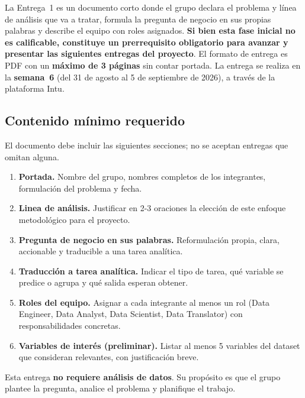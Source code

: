 \documentclass[11pt,letterpaper]{article}
\begin{document}
La Entrega~1 es un documento corto donde el grupo declara el problema y línea de análisis que va a tratar, formula la pregunta de negocio en sus propias palabras y describe el equipo con roles asignados. \textbf{Si bien esta fase inicial no es calificable, constituye un prerrequisito obligatorio para avanzar y presentar las siguientes entregas del proyecto}. El formato de entrega es PDF con un \textbf{máximo de 3 páginas} sin contar portada. La entrega se realiza en la \textbf{semana~6} (del 31 de agosto al 5 de septiembre de 2026), a través de la plataforma Intu.



\subsection{Contenido mínimo requerido}

El documento debe incluir las siguientes secciones; no se aceptan entregas que omitan alguna.

\begin{enumerate}
  \item \textbf{Portada.} Nombre del grupo, nombres completos de los integrantes, formulación del problema y fecha.
 \item \textbf{Linea de análisis.} Justificar en 2-3 oraciones la elección de este enfoque metodológico para el proyecto.
  \item \textbf{Pregunta de negocio en sus palabras.} Reformulación propia, clara, accionable y traducible a una tarea analítica.
  \item \textbf{Traducción a tarea analítica.} Indicar el tipo de tarea, qué variable se predice o agrupa y qué salida esperan obtener.
  \item \textbf{Roles del equipo.} Asignar a cada integrante al menos un rol (Data Engineer, Data Analyst, Data Scientist, Data Translator) con responsabilidades concretas.
  \item \textbf{Variables de interés (preliminar).} Listar al menos 5 variables del dataset que consideran relevantes, con justificación breve.
\end{enumerate}

Esta entrega \textbf{no requiere análisis de datos}. Su propósito es que el grupo plantee la pregunta, analice el problema y planifique el trabajo.
\end{document}
